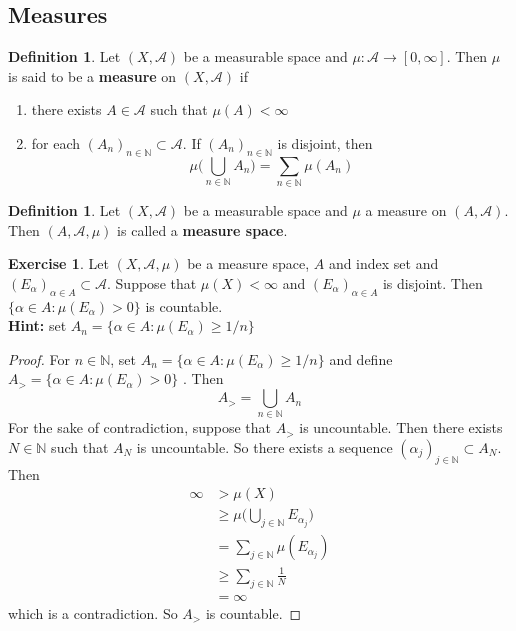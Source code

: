 \documentclass[12pt]{amsart}
\theoremstyle{definition}
\newtheorem{defn}[definition]{Definition}
\newtheorem{ex}[definition]{Exercise}
\newcommand{\al}{\alpha}
\newcommand{\N}{\mathbb{N}}
\newcommand{\MA}{\mathcal{A}}
\newcommand{\RG}{[0,\infty]}
\newcommand{\lex}[1]{\label{ex:#1}}
\newcommand{\ld}[1]{\label{defn:#1}}
\begin{document}
	
	
	
	
	
	
	
	
	
	
	
	
	
	
	
	
	
	
	
	
	\newpage
	\subsection{Measures}
	
	\begin{defn} \ld{00000} 
		Let $(X, \MA)$ be a measurable space and $\mu:\MA \rightarrow \RG$. Then $\mu$ is said to be a \textbf{measure} on $(X, \MA)$ if 
		\begin{enumerate}
			\item there exists $A \in \MA$ such that $\mu(A)< \infty$
			\item for each $(A_n)_{n \in \N} \subset \MA$. If $(A_n)_{n \in \N}$ is disjoint, then $$\mu\bigg(\bigcup_{n \in \N}A_n \bigg) = \sum_{n \in \N}\mu(A_n)$$
		\end{enumerate}
	\end{defn}
	
	\begin{defn} \ld{00000} 
		Let $(X,\MA)$ be a measurable space and $\mu$ a measure on $(A, \MA)$. Then $(A, \MA, \mu)$ is called a \textbf{measure space}. 
	\end{defn}
	
	\begin{ex} \lex{00000} 
	Let $(X, \MA, \mu)$ be a measure space, $A$ and index set and $(E_{\al})_{\al \in A} \subset \MA$. Suppose that $\mu(X) < \infty$ and $(E_\al)_{\al \in A }$ is disjoint. Then $\{\al \in A: \mu(E_{\al}) >0\}$ is countable.\\
	\textbf{Hint:} set $A_n = \{\al \in A: \mu(E_{\al}) \geq 1/n \}$ 
	\end{ex}
	
	\begin{proof}
	For $n \in \N$, set $A_n = \{\al \in A: \mu(E_{\al}) \geq 1/n \}$ and define $ A_> = \{\al \in A: \mu(E_{\al}) >0\}$ . Then 
	$$A_> = \bigcup_{n \in \N}A_n$$
	For the sake of contradiction, suppose that 
	$A_>$ is uncountable. Then there exists $N \in \N$ such that $A_N$ is uncountable. So there exists a sequence $(\al_j)_{j \in \N} \subset A_N$. Then 
	\begin{align*}
	\infty 
	& > \mu(X) \\
	& \geq \mu \bigg( \bigcup_{j \in \N} E_{\al_{j}} \bigg) \\
	&= \sum_{j \in \N} \mu(E_{\al_j}) \\
	& \geq \sum_{j \in \N} \frac{1}{N} \\
	&= \infty
	\end{align*} 
	which is a contradiction. So $A_>$ is countable.
	\end{proof}
	
\end{document}
